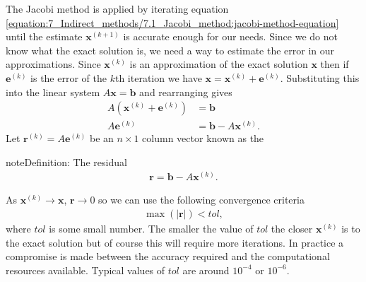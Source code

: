 \documentclass[letterpaper,10pt,english]{jupyterBook}
\begin{document}
\sphinxAtStartPar
The Jacobi method is applied by iterating equation \eqref{equation:7_Indirect_methods/7.1_Jacobi_method:jacobi-method-equation} until the estimate \(\mathbf{x}^{(k+1)}\) is accurate enough for our needs. Since we do not know what the exact solution is, we need a way to estimate the error in our approximations. Since \(\mathbf{x}^{(k)}\) is an approximation of the exact solution \(\mathbf{x}\) then if \(\mathbf{e}^{(k)}\) is the error of the \(k\)th iteration we have \(\mathbf{x} = \mathbf{x}^{(k)} + \mathbf{e}^{(k)}\). Substituting this into the linear system \(A\mathbf{x} = \mathbf{b}\) and rearranging gives
\begin{align*}
    A (\mathbf{x}^{(k)} +\mathbf{e}^{(k)}) &= \mathbf{b} \\
    A\mathbf{e}^{(k)} &= \mathbf{b} - A\mathbf{x}^{(k)}.
\end{align*}
\sphinxAtStartPar
Let \(\mathbf{r}^{(k)} = A\mathbf{e}^{(k)}\) be an \(n \times 1\) column vector known as the 

\begin{sphinxadmonition}{note}{Definition: The residual}
\begin{equation}\label{equation:7_Indirect_methods/7.1_Jacobi_method:residual-equation}
\begin{split}\mathbf{r}  = \mathbf{b} - A \mathbf{x}^{(k)}.\end{split}
\end{equation}\end{sphinxadmonition}

\sphinxAtStartPar
As \(\mathbf{x}^{(k)} \to \mathbf{x}\), \(\mathbf{r} \to 0\) so we can use the following convergence criteria
\begin{align*}
    \max(|\mathbf{r}|) < tol,
\end{align*}
\sphinxAtStartPar
where \(tol\) is some small number. The smaller the value of \(tol\) the closer \(\mathbf{x}^{(k)}\) is to the exact solution but of course this will require more iterations. In practice a compromise is made between the accuracy required and the computational resources available. Typical values of \(tol\) are around \(10^{-4}\) or \(10^{-6}\).
\end{document}
